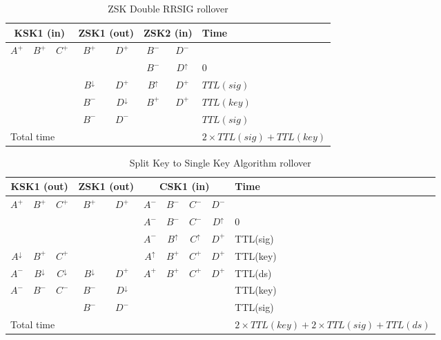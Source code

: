 \documentclass[twoside, a4paper]{article}
\begin{document}
\begin{table}[h]
\centering
\begin{tabular}{ |ccc|cc|cc|l| }
\hline
\multicolumn{3}{|c|}{KSK1 (in)} & \multicolumn{2}{c|}{ZSK1 (out)} & \multicolumn{2}{c|}{ZSK2 (in)} & Time\\
\hline
$A^{+}$ & $B^{+}$ & $C^{+}$ & $B^{+}$          & $D^{+}$          & $B^{-}$        & $D^{-}$        & \\
        &         &         &                  &                  & $B^{-}$        & $D^{\uparrow}$ & $0$\\
        &         &         & $B^{\downarrow}$ & $D^{+}$          & $B^{\uparrow}$ & $D^{+}$        & $TTL(sig)$\\
        &         &         & $B^{-}$          & $D^{\downarrow}$ & $B^{+}$        & $D^{+}$        & $TTL(key)$\\
        &         &         & $B^{-}$          & $D^{-}$          &                &                & $TTL(sig)$\\
\hline
\multicolumn{7}{|l|}{Total time} & $2 \times TTL(sig) + TTL(key)$\\
\hline
\end{tabular}
\caption{ZSK Double RRSIG rollover}
\label{tab:roll_doublerrsig}
\end{table}


\begin{table}[h]
\centering
\begin{tabular}{ |ccc|cc|cccc|l| }
\hline
\multicolumn{3}{|c|}{KSK1 (out)} & \multicolumn{2}{c|}{ZSK1 (out)} & \multicolumn{4}{c|}{CSK1 (in)} & Time\\
\hline
$A^{+}$ & $B^{+}$ & $C^{+}$ & $B^{+}$          & $D^{+}$          & $A^{-}$ & $B^{-}$ & $C^{-}$ & $D^{-}$               & \\
        &         &         &                  &                  & $A^{-}$ & $B^{-}$ & $C^{-}$ & $D^{\uparrow}$        & 0\\
        &         &         &                  &                  & $A^{-}$ & $B^{\uparrow}$ & $C^{\uparrow}$ & $D^{+}$ & TTL(sig)\\
$A^{\downarrow}$  & $B^{+}$ & $C^{+}$ &        &                  & $A^{\uparrow}$ & $B^{+}$ & $C^{+}$ & $D^{+}$        & TTL(key)\\
$A^{-}$  & $B^{\downarrow}$ & $C^{\downarrow}$ & $B^{\downarrow}$ &$D^{+}$ & $A^{+}$ & $B^{+}$ & $C^{+}$ & $D^{+}$               & TTL(ds)\\
$A^{-}$  & $B^{-}$ & $C^{-}$ & $B^{-}$ &$D^{\downarrow}$ &    &   &   &                                        & TTL(key)\\
        &         &         & $B^{-}$ & $D^{-}$                   &    &   &   &                                        & TTL(sig)\\
\hline
\multicolumn{9}{|l|}{Total time} & $2 \times TTL(key) + 2 \times TTL(sig) + TTL(ds)$\\
\hline
\end{tabular}
\caption{Split Key to Single Key Algorithm rollover}
\label{tab:roll_doublerrsig}
\end{table}
\end{document}
